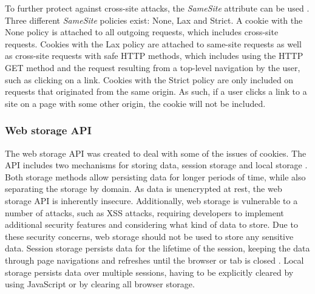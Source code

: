 To further protect against cross-site attacks, the \textit{SameSite} attribute can be used \citep{khodayari_state_2022}.
Three different \textit{SameSite}  policies exist: None, Lax and Strict.
A cookie with the None policy is attached to all outgoing requests, which includes cross-site requests.
Cookies with the Lax policy are attached to same-site requests as well as cross-site requests with safe HTTP methods, which includes using the HTTP GET method and the request resulting from a top-level navigation by the user, such as clicking on a link.
Cookies with the Strict policy are only included on requests that originated from the same origin.
As such, if a user clicks a link to a site on a page with some other origin, the cookie will not be included.

\subsubsection{Web storage API}
The web storage API was created to deal with some of the issues of cookies.
The API includes two mechanisms for storing data, session storage and local storage \citep{noauthor_html_nodate}.
Both storage methods allow persisting data for longer periods of time, while also separating the storage by domain.
As data is unencrypted at rest, the web storage API is inherently insecure.
Additionally, web storage is vulnerable to a number of attacks, such as XSS attacks, requiring developers to implement additional security features and considering what kind of data to store.
Due to these security concerns, web storage should not be used to store any sensitive data.
Session storage persists data for the lifetime of the session, keeping the data through page navigations and refreshes until the browser or tab is closed \citep{noauthor_web_2023}.
Local storage persists data over multiple sessions, having to be explicitly cleared by using JavaScript or by clearing all browser storage.


